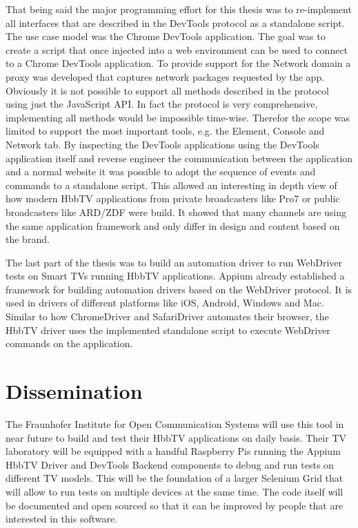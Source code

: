 That being said the major programming effort for this thesis was to re-implement all interfaces that are described in
the DevTools protocol as a standalone script. The use case model was the Chrome DevTools application. The goal was to
create a script that once injected into a web environment can be used to connect to a Chrome DevTools application. To
provide support for the Network domain a proxy was developed that captures network packages requested by the
app. Obviously it is not possible to support all methods described in the protocol using just the JavaScript
API. In fact the protocol is very comprehensive, implementing all methods would be impossible time-wise. Therefor the
scope was limited to support the most important tools, e.g. the Element, Console and Network tab. By inspecting the
DevTools applications using the DevTools application itself and reverse engineer the communication between the
application and a normal website it was possible to adopt the sequence of events and commands to a standalone script.
This allowed an interesting in depth view of how modern HbbTV applications from private broadcasters like Pro7 or
public broadcasters like ARD/ZDF were build. It showed that many channels are using the same application framework
and only differ in design and content based on the brand.

The last part of the thesis was to build an automation driver to run WebDriver tests on Smart TVs running HbbTV
applications. Appium already established a framework for building automation drivers based on the WebDriver
protocol. It is used in drivers of different platforms like iOS, Android, Windows and Mac. Similar
to how ChromeDriver and SafariDriver automates their browser, the HbbTV driver uses the implemented standalone
script to execute WebDriver commands on the application.

\section{Dissemination\label{sec:dissemination}}


The Fraunhofer Institute for Open Communication Systems will use this tool in near future to build and test their
HbbTV applications on daily basis. Their TV laboratory will be equipped with a handful Raspberry Pis running the
Appium HbbTV Driver and DevTools Backend components to debug and run tests on different TV models. This will be the
foundation of a larger Selenium Grid that will allow to run tests on multiple devices at the same time. The code
itself will be documented and open sourced so that it can be improved by people that are interested in this software.

